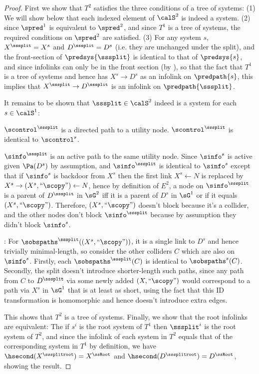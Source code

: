 \begin{proof}
First we show that $T^2$ satisfies the three conditions of a tree of systems: (1)
We will show below that each indexed element of $\calS^2$ is indeed a system.
(2) since $\spred^1$ is equivalent to $\spred^2$, and since ${T^1}$ is a tree of systems, the required conditions on $\spred^2$ are satisfied.
(3) For any system $s$, $X^{\sssplit}=X^s$ and $D^{\sssplit}=D^s$ (i.e. they are unchanged under the split), and the front-section of $\predsys{\sssplit}$ is identical to that of $\predsys{s}$, and since infolinks can only be in the front section (by ), so that the fact that ${T^1}$ is a tree of systems and hence has $X^s\to D^s$ as an infolink on $\predpath{s}$, this implies that $X^{\sssplit}\to D^{\sssplit}$ is an infolink on $\predpath{\sssplit}$.

It remains to be shown that $\sssplit \in \calS^2$ indeed is a system for each $s \in \calS^1$:
    
     {$\scontrol^{\sssplit}$ is a directed path to a utility node}. 
    $\scontrol^{\sssplit}$ is identical to $\scontrol^s$.
    
     {$\sinfo^{\sssplit}$ is an active path to the same utility node}.
    Since $\sinfo^s$ is active given $\Pa(D^s)$ by assumption, and $\sinfo^{\sssplit}$ is identical to $\sinfo^s$ except that if $\sinfo^s$ is backdoor from $X^s$ then the first link $X^s\gets N$ is replaced by $X^s\to (X^s, ``\scopy")\gets N$, hence by definition of $E^2$, a node on $\sinfo^{\sssplit}$ is a parent of $D^{\sssplit}$ in $\sG^2$ iff it is a parent of $D^s$ in $\sG^1$ or if it equals $(X^s, ``\scopy")$. Therefore, $(X^s, ``\scopy")$ doesn't block because it's a collider, and the other nodes don't block $\sinfo^{\sssplit}$ because by assumption they didn't block $\sinfo^s$.
    
    : For $\sobspaths^\sssplit((X^s,``\scopy"))$, it is a single link to $D^s$ and hence trivially minimal-length, so consider the other colliders $C$ which are also on $\sinfo^s$. Firstly, each $\sobspaths^{\sssplit}(C)$ is identical to $\sobspaths^s(C)$. Secondly, the split doesn't introduce shorter-length such paths, since any path from $C$ to $D^{\sssplit}$ via some newly added $(X, ``\scopy")$ would correspond to a path via $X^s$ in $\sG^1$ that is at least as short, using the fact that this ID transformation is homomorphic and hence doesn't introduce extra edges. 

This shows that $T^2$ is a tree of systems. Finally, we show that the root infolinks are equivalent:
The if $s^i$ is the root system of ${T^1}$ then $\sssplit^i$ is the root system of $T^2$, and since the infolink of each system in $T^2$ equals that of the corresponding system in ${T^1}$ by definition, we have $\hsecond(X^{\sssplitroot})=X^{\ssRoot}$ and $\hsecond(D^{\sssplitroot})=D^{\ssRoot}$, showing the result.
\end{proof}



